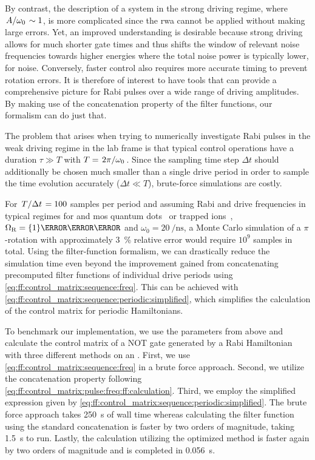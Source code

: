 By contrast, the description of a system in the strong driving regime, where $\flatfrac{A}{\omega_0}\sim 1$, is more complicated since the \gls{rwa} cannot be applied without making large errors.
Yet, an improved understanding is desirable because strong driving allows for much shorter gate times and thus shifts the window of relevant noise frequencies towards higher energies where the total noise power is typically lower, \eg for \oneoverf noise.
Conversely, faster control also requires more accurate timing to prevent rotation errors.
It is therefore of interest to have tools that can provide a comprehensive picture for Rabi pulses over a wide range of driving amplitudes.
By making use of the concatenation property of the filter functions, our formalism can do just that.

The problem that arises when trying to numerically investigate Rabi pulses in the weak driving regime in the lab frame is that typical control operations have a duration $\tau\gg T$ with $T = \flatfrac{2\pi}{\omega_0}$.
Since the sampling time step $\Delta t$ should additionally be chosen much smaller than a single drive period in order to sample the time evolution accurately ($\Delta t\ll T$), brute-force simulations are costly.

For $\flatfrac{T}{\Delta t} = 100$ samples per period and assuming Rabi and drive frequencies in typical regimes for  and \acrshort{mos} quantum dots~\cite{Zajac2018,Pla2012} or trapped ions~\cite{Soare2014}, $\Omega_\mr{R} = \qty{1}{\per\micro\second}$ and $\omega_0 = \qty{20}{\per\nano\second}$, a Monte Carlo simulation of a $\pi$-rotation with approximately \qty{3}{\percent} relative error would require $10^9$ samples in total.
Using the filter-function formalism, we can drastically reduce the simulation time even beyond the improvement gained from concatenating precomputed filter functions of individual drive periods using \cref{eq:ff:control_matrix:sequence:freq}.
This can be achieved with \cref{eq:ff:control_matrix:sequence:periodic:simplified}, which simplifies the calculation of the control matrix for periodic Hamiltonians.

To benchmark our implementation, we use the parameters from above and calculate the control matrix of a NOT gate generated by a Rabi Hamiltonian with three different methods on an \fastprocessor.
First, we use \cref{eq:ff:control_matrix:sequence:freq} in a brute force approach.
Second, we utilize the concatenation property following \cref{eq:ff:control_matrix:pulse:freq:ff:calculation}.
Third, we employ the simplified expression given by \cref{eq:ff:control_matrix:sequence:periodic:simplified}.
The brute force approach takes \qty{250}{\second} of wall time whereas calculating the filter function using the standard concatenation is faster by two orders of magnitude, taking \qty{1.5}{\second} to run.
Lastly, the calculation utilizing the optimized method is faster again by two orders of magnitude and is completed in \qty{0.056}{\second}.


